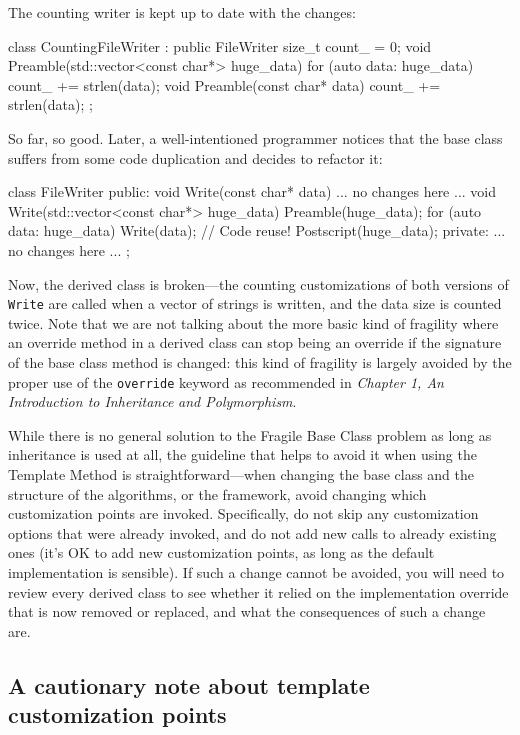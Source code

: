 The counting writer is kept up to date with the changes:

\begin{code}
class CountingFileWriter : public FileWriter {
  size_t count_ = 0;
  void Preamble(std::vector<const char*> huge_data) {
    for (auto data: huge_data) count_ += strlen(data);
  }
  void Preamble(const char* data) {
    count_ += strlen(data);
  }
};
\end{code}

So far, so good. Later, a well-intentioned programmer notices that the base class suffers from some code duplication and decides to refactor it:

\begin{code}
class FileWriter {
  public:
  void Write(const char* data) { ... no changes here ... }
  void Write(std::vector<const char*> huge_data) {
    Preamble(huge_data);
    for (auto data: huge_data) Write(data); // Code reuse!
    Postscript(huge_data);
  }
  private:
  ... no changes here ...
};
\end{code}

Now, the derived class is broken---the counting customizations of both versions of \texttt{Write} are called when a vector of strings is written, and the data size is counted twice. Note that we are not talking about the more basic kind of fragility where an override method in a derived class can stop being an override if the signature of the base class method is changed: this kind of fragility is largely avoided by the proper use of the \texttt{override} keyword as recommended in \emph{Chapter 1, An Introduction to Inheritance} \emph{and Polymorphism}.

While there is no general solution to the Fragile Base Class problem as long as inheritance is used at all, the guideline that helps to avoid it when using the Template Method is straightforward---when changing the base class and the structure of the algorithms, or the framework, avoid changing which customization points are invoked. Specifically, do not skip any customization options that were already invoked, and do not add new calls to already existing ones (it's OK to add new customization points, as long as the default implementation is sensible). If such a change cannot be avoided, you will need to review every derived class to see whether it relied on the implementation override that is now removed or replaced, and what the consequences of such a change are.

\subsection{A cautionary note about template customization points}

